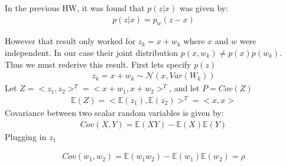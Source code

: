 \documentclass{article}
\begin{document}
In the previous HW, it was found that $p(z|x)$ was given by:
\begin{align*}
p(z|x) = p_w(z-x)
\end{align*}

However that result only worked for $z_k = x + w_k$ where $x$ and $w$ were independent. In our case their joint distribution $p(x,w_k)\neq p(x)p(w_k)$. Thus we must rederive this result. First lets specify $p(z)$
\begin{align*}
z_k = x + w_k \sim \mathcal{N}(x,Var(W_k))
\end{align*}
Let $Z = <z_1,z_2>^T = <x+w_1,x+w_2>^T$, and let $P = Cov(Z)$
\begin{align*}
\mathbb{E}(Z) = <\mathbb{E}(z_1),\mathbb{E}(z_2)>^T = <x,x>
\end{align*}
Covariance between two scalar random variables is given by:
\begin{align*}
Cov(X,Y) = \mathbb{E}(XY) - \mathbb{E}(X)\mathbb{E}(Y)
\end{align*}
Plugging in $z_1$

\begin{align*}
Cov(w_1,w_2) = \mathbb{E}(w_1 w_2) - \mathbb{E}(w_1)\mathbb{E}(w_2) = \rho
\end{align*}
\end{document}
